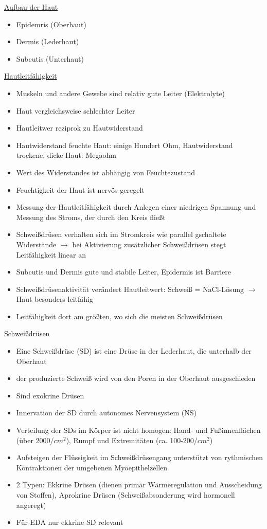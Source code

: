 \documentclass[a4paper,10pt,oneside]{article}
\begin{document}
\underline{Aufbau der Haut} \\
	\begin{itemize}
		\item Epidemris (Oberhaut)
		\item Dermis (Lederhaut)
		\item Subcutis (Unterhaut)
	\end{itemize}
	
\underline{Hautleitfähigkeit} \\
	\begin{itemize}
		\item Muskeln und andere Gewebe sind relativ gute Leiter (Elektrolyte)
		\item Haut vergleichsweise schlechter Leiter
		\item Hautleitwer reziprok zu Hautwiderstand
		\item Hautwiderstand feuchte Haut: einige Hundert Ohm, Hautwiderstand trockene, dicke Haut: Megaohm
		\item Wert des Widerstandes ist abhängig von Feuchtezustand
		\item Feuchtigkeit der Haut ist nervös geregelt
		\item Messung der Hautleitfähigkeit durch Anlegen einer niedrigen Spannung und Messung des Stroms, der durch den Kreis fließt
		\item Schweißdrüsen verhalten sich im Stromkreis wie parallel gschaltete Widerstände $\rightarrow$ bei Aktivierung zusätzlicher Schweißdrüsen stegt Leitfähigkeit linear an
		\item Subcutis und Dermis gute und stabile Leiter, Epidermis ist Barriere
		\item Schweißdrüsenaktivität verändert Hautleitwert: Schweiß = NaCl-Lösung $\rightarrow$ Haut besonders leitfähig
		\item Leitfähigkeit dort am größten, wo sich die meisten Schweißdrüsen
	\end{itemize}
	
 		
\underline{Schweißdrüsen} \\
	\begin{itemize}
		\item Eine Schweißdrüse (SD) ist eine Drüse in der Lederhaut, die unterhalb der Oberhaut
		\item der produzierte Schweiß wird von den Poren in der Oberhaut ausgeschieden 
		\item Sind exokrine Drüsen
		\item Innervation der SD durch autonomes Nervensystem (NS)
		\item Verteilung der SDs im Körper ist nicht homogen: Hand- und Fußinnenflächen (über 2000/$cm^2$), Rumpf und Extremitäten (ca. 100-200/$cm^2$)
		\item Aufsteigen der Flüssigkeit im Schweißdrüsengang unterstützt von rythmischen Kontraktionen der umgebenen Myoepithelzellen
		\item 2 Typen: Ekkrine Drüsen (dienen primär Wärmeregulation und Ausscheidung von Stoffen), Aprokrine Drüsen (Schweißabsonderung wird hormonell angeregt)
		\item Für EDA nur ekkrine SD relevant
	\end{itemize}
	
\end{document}
